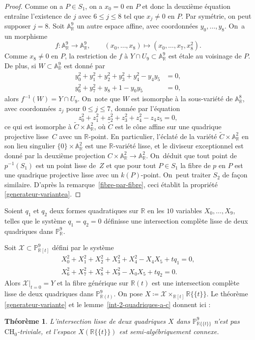 \documentclass[11pt]{article}
\newcommand{\CH}{\mathrm{CH}}
\newtheorem{thm}{Théorème}[section]
\theoremstyle{definition}
\newcommand{\R}{\mathbb R}
\newcommand{\A}{\mathbb A}
\renewcommand{\P}{\mathbb P}
\newcommand{\mc}[1]{\mathcal{#1}}
\newcommand{\puiseux}{\mathbb{R}\{\!\{t\}\!\}}
\begin{document}
\begin{proof}
Comme on a $P\in S_1$, on a $x_0=0$ en $P$ et donc la deuxième équation entraîne l'existence de $j$ avec $6\leq j\leq 8$ tel que $x_j\neq 0$ en $P$. Par symétrie, on peut supposer $j=8$. Soit $\A^9_\R$ un autre espace affine, avec coordonnées $y_0,\dots,y_8$. On~a un morphisme
\[f\colon \A^9_\R\to \A^9_\R,\qquad (x_0,\dots,x_8)\mapsto (x_0,\dots,x_7,x_8^2).\]
Comme $x_8\neq 0$ en $P$, la restriction de $f$ à $Y\cap U_9\subset \A^9_\R$ est étale au voisinage de $P$. De plus, si $W\subset \A^9_\R$ est donné par
\begin{align*}
y_0^2+y_1^2+y_2^2+y_3^2+y_4^2-y_4y_5&=0,\\
y_6^2+y_7^2+y_8+1-y_0y_5&=0,
\end{align*}
alors $f^{-1}(W)=Y\cap U_9$. On~note que $W$ est isomorphe à la sous-variété de $\A^8_\R$, avec coordonnées $z_j$ pour $0\leq j\leq 7$, donnée par l'équation
\[z_0^2+z_1^2+z_2^2+z_3^2+z_4^2-z_4z_5=0,\]
ce qui est isomorphe à $\tilde{C}\times \A^2_\R$, où $\tilde{C}$ est le cône affine sur une quadrique projective lisse~$C$ avec un $\R$-point. En particulier, l'éclaté de la variété $\tilde{C}\times \A^2_\R$ en son lieu singulier $\{0\}\times \A^2_\R$ est une $\R$-variété lisse, et le diviseur exceptionnel est donné par la deuxième projection $C\times \A^2_\R\to \A^2_\R$. On~déduit que tout point de $p^{-1}(S_1)$ est un point lisse de~$Z$ et que pour tout $P\in S_1$ la fibre de $p$ en $P$ est une quadrique projective lisse avec un $k(P)$-point. On~peut traiter $S_2$ de façon similaire. D'après la remarque~\ref{fibre-par-fibre}, ceci établit
la propriété \eqref{generateur-variantea}.
\end{proof}

Soient $q_1$ et $q_2$ deux formes quadratiques sur $\R$ en les $10$ variables $X_0,\dots,X_9$, telles que le système $q_1=q_2=0$ définisse une intersection complète lisse de deux quadriques dans $\P^9_{\R}$.

Soit $\mc{X}\subset \P^9_{\R[t]}$ défini par le système
\begin{align*}
X_0^2+X_1^2+X_2^2+X_3^2+X_4^2 - X_4X_5 +tq_1=0, \\
X_6^2+X_7^2+X_8^2+X_9^2 -X_0X_5 + tq_2=0.
\end{align*}
Alors $\mc{X}|_{t=0}=Y$ et la fibre générique sur $\R(t)$ est une intersection complète lisse de deux quadriques dans $\P^9_{\R(t)}$.
On pose $X\coloneqq \mc{X}\times_{\R[t]}\puiseux$.
Le théorème \ref{generateur-variante} et le lemme~\ref{int-2-quadriques-a-c} donnent ici :

\begin{thm}\label{intersection-quadriques-p9}
L'intersection lisse de deux quadriques $X$ dans $\P^9_{\puiseux}$ n'est pas $\CH_0$-triviale, et l'espace $X(\puiseux)$ est semi-algébriquement connexe.
\end{thm}
\end{document}
